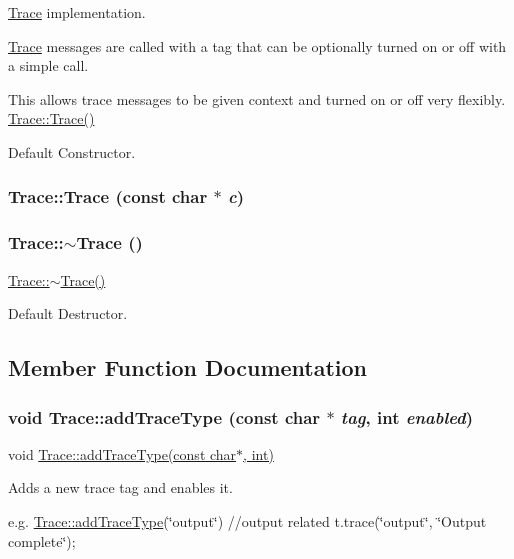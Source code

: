 \hyperlink{classTrace}{Trace} implementation.

\hyperlink{classTrace}{Trace} messages are called with a tag that can be optionally turned on or off with a simple call.

This allows trace messages to be given context and turned on or off very flexibly. \hyperlink{classTrace_aafef8ed744b967d133c34c8a813f7fc5}{Trace::Trace()}

Default Constructor. \hypertarget{classTrace_ae1caa27c33613b7645a212c31d19bc68}{
\subsubsection[{Trace}]{\setlength{\rightskip}{0pt plus 5cm}Trace::Trace (const char $\ast$ {\em c})}}
\label{classTrace_ae1caa27c33613b7645a212c31d19bc68}
\hypertarget{classTrace_a39492ecec74969a4905ec5fcf026dc09}{
\subsubsection[{$\sim$Trace}]{\setlength{\rightskip}{0pt plus 5cm}Trace::$\sim$Trace ()}}
\label{classTrace_a39492ecec74969a4905ec5fcf026dc09}
\hyperlink{classTrace_a39492ecec74969a4905ec5fcf026dc09}{Trace::$\sim$Trace()}

Default Destructor. 

\subsection{Member Function Documentation}
\hypertarget{classTrace_a307942e3b0179af28fb7a7a0868fe4b1}{
\subsubsection[{addTraceType}]{\setlength{\rightskip}{0pt plus 5cm}void Trace::addTraceType (const char $\ast$ {\em tag}, \/  int {\em enabled})}}
\label{classTrace_a307942e3b0179af28fb7a7a0868fe4b1}
void \hyperlink{classTrace_a307942e3b0179af28fb7a7a0868fe4b1}{Trace::addTraceType(const char$\ast$, int)}

Adds a new trace tag and enables it.

e.g. \hyperlink{classTrace_a307942e3b0179af28fb7a7a0868fe4b1}{Trace::addTraceType}(\char`\"{}output\char`\"{}) //output related t.trace(\char`\"{}output\char`\"{}, \char`\"{}Output complete\char`\"{});


